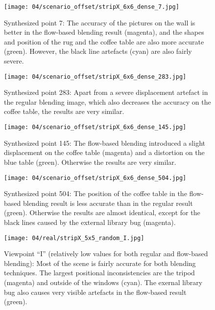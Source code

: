 \begin{figure}
  \centering
  \texttt{[image: 04/scenario\_offset/stripX\_6x6\_dense\_7.jpg]}
  \caption[Viewpoint 7 of 625 in the square room]{Synthesized point 7: The accuracy of the pictures on the wall is better in the flow-based blending result (magenta), and the shapes and position of the rug and the coffee table are also more accurate (green). However, the black line artefacts (cyan) are also fairly severe.}
  \label{fig:offset_7}
\end{figure}


\begin{figure}
  \centering
  \texttt{[image: 04/scenario\_offset/stripX\_6x6\_dense\_283.jpg]}
  \caption[Viewpoint 283 of 625 in the square room]{Synthesized point 283: Apart from a severe displacement artefact in the regular blending image, which also decreases the accuracy on the coffee table, the results are very similar.}
  \label{fig:offset_283}
\end{figure}

\begin{figure}
  \centering
  \texttt{[image: 04/scenario\_offset/stripX\_6x6\_dense\_145.jpg]}
  \caption[Viewpoint 145 of 625 in the square room]{Synthesized point 145: The flow-based blending introduced a slight displacement on the coffee table (magenta) and a distortion on the blue table (green). Otherwise the results are very similar.}
  \label{fig:offset_145}
\end{figure}

\begin{figure}
  \centering
  \texttt{[image: 04/scenario\_offset/stripX\_6x6\_dense\_504.jpg]}
  \caption[Viewpoint 504 of 625 in the square room]{Synthesized point 504: The position of the coffee table in the flow-based blending result is less accurate than in the regular result (green). Otherwise the results are almost identical, except for the black lines caused by the external library bug (magenta).}
  \label{fig:offset_504}
\end{figure}

\begin{figure}
  \centering
  \texttt{[image: 04/real/stripX\_5x5\_random\_I.jpg]}
  \caption[Viewpoint ``I'' in the real scene]{Viewpoint ``I'' (relatively low values for both regular and flow-based blending): Most of the scene is fairly accurate for both blending techniques. The largest positional inconsistencies are the tripod (magenta) and outside of the windows (cyan). The exernal library bug also causes very visible artefacts in the flow-based result (green).}
  \label{fig:real_I}
\end{figure}

